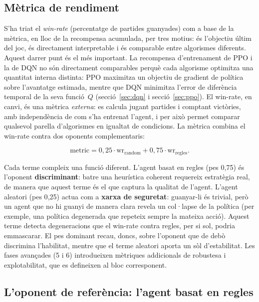 \subsection*{Mètrica de rendiment}

S'ha triat el \emph{win-rate} (percentatge de partides guanyades) com a base de la
mètrica, en lloc de la recompensa acumulada, per tres motius: és l'objectiu últim del joc,
és directament interpretable i és comparable entre algorismes diferents. Aquest darrer
punt és el més important. La recompensa d'entrenament de PPO i la de DQN no són
directament comparables perquè cada algorisme optimitza una quantitat interna distinta:
PPO maximitza un objectiu de gradient de política sobre l'avantatge estimada, mentre que
DQN minimitza l'error de diferència temporal de la seva funció~$Q$ (secció~\ref{sec:dqn} i
secció~\ref{sec:ppo}). El win-rate, en canvi, és una mètrica
\emph{externa}: es calcula jugant partides i comptant victòries, amb independència de com
s'ha entrenat l'agent, i per això permet comparar qualsevol parella d'algorismes en
igualtat de condicions. La mètrica combina el win-rate contra dos oponents complementaris:

\begin{equation}
  \text{metric} = 0{,}25 \cdot \text{wr}_{\text{random}} + 0{,}75 \cdot \text{wr}_{\text{regles}}.
  \label{eq:metric}
\end{equation}

Cada terme compleix una funció diferent. L'agent basat en regles (pes 0{,}75) és l'oponent
\textbf{discriminant}: batre una heurística coherent requereix estratègia real, de manera
que aquest terme és el que captura la qualitat de l'agent. L'agent aleatori
(pes 0{,}25) actua com a \textbf{xarxa de seguretat}: guanyar-li és trivial, però un agent
que no hi guanyi de manera clara revela un col·lapse de la política (per exemple, una
política degenerada que repeteix sempre la mateixa acció). Aquest terme detecta
degeneracions que el win-rate contra regles, per si sol, podria emmascarar. El pes
dominant recau, doncs, sobre l'oponent que de debò discrimina l'habilitat, mentre que el
terme aleatori aporta un sòl d'estabilitat. Les fases avançades (5 i 6) introdueixen
mètriques addicionals de robustesa i explotabilitat, que es defineixen al bloc
corresponent.

\subsection*{L'oponent de referència: l'agent basat en regles}

